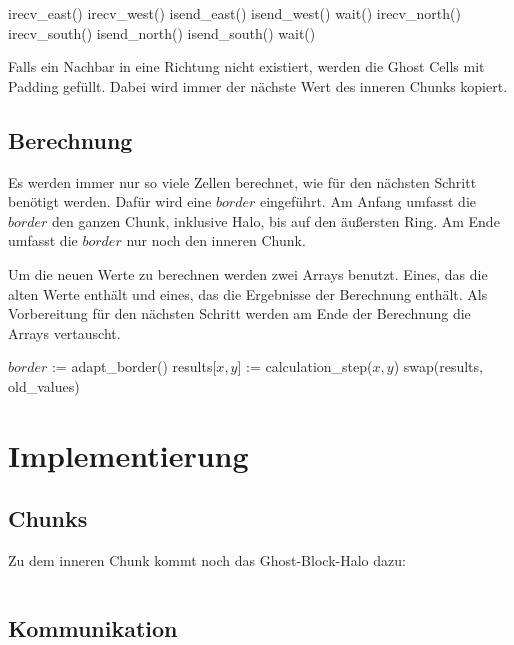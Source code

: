 \documentclass[12pt]{article}
\begin{document}
\begin{algorithmic}[1]
    \State irecv\_east()
    \State irecv\_west()
    \State isend\_east()
    \State isend\_west()
    \State wait()
    \State irecv\_north()
    \State irecv\_south()
    \State isend\_north()
    \State isend\_south()
    \State wait()
\end{algorithmic}

Falls ein Nachbar in eine Richtung nicht existiert, werden die Ghost Cells mit Padding gefüllt. Dabei wird immer der nächste Wert des inneren Chunks kopiert.

\subsection{Berechnung}
Es werden immer nur so viele Zellen berechnet, wie für den nächsten Schritt benötigt werden. Dafür wird eine $border$ eingeführt.
Am Anfang umfasst die $border$ den ganzen Chunk, inklusive Halo, bis auf den äußersten Ring. Am Ende umfasst die $border$ nur noch den inneren Chunk.

Um die neuen Werte zu berechnen werden zwei Arrays benutzt. Eines, das die alten Werte enthält und eines, das die Ergebnisse der Berechnung enthält. Als Vorbereitung für den nächsten Schritt werden am Ende der Berechnung die Arrays vertauscht.

\begin{algorithmic}[1]
    \State $border$ := adapt\_border()
        \State results[$x,y$] := calculation\_step($x,y$) 
    \EndFor
    \State swap(results, old\_values)
\end{algorithmic}


\clearpage
\section{Implementierung}
\subsection{Chunks}
Zu dem inneren Chunk kommt noch das Ghost-Block-Halo dazu:
\inputminted[fontsize=\scriptsize, firstline=68, lastline=73]{C}{../src/waermeleitung.c}

\subsection{Kommunikation}
\end{document}
